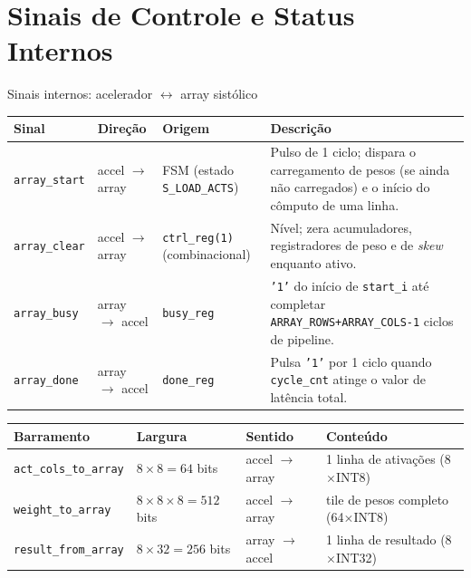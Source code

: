 \documentclass[aspectratio=169,10pt]{beamer}
\begin{document}
\section{Sinais de Controle e Status Internos}

\begin{frame}{Sinais internos: acelerador $\leftrightarrow$ array sistólico}
  \small
  \begin{tabularx}{\linewidth}{lll X}
    \toprule
    \textbf{Sinal} & \textbf{Direção} & \textbf{Origem} & \textbf{Descrição} \\
    \midrule
    \texttt{array\_start} & accel $\to$ array & FSM (estado \texttt{S\_LOAD\_ACTS}) &
      Pulso de 1 ciclo; dispara o carregamento de pesos (se ainda não carregados)
      e o início do cômputo de uma linha. \\
    \texttt{array\_clear} & accel $\to$ array & \texttt{ctrl\_reg(1)} (combinacional) &
      Nível; zera acumuladores, registradores de peso e de \emph{skew} enquanto ativo. \\
    \texttt{array\_busy} & array $\to$ accel & \texttt{busy\_reg} &
      \texttt{'1'} do início de \texttt{start\_i} até completar \texttt{ARRAY\_ROWS+ARRAY\_COLS-1}
      ciclos de pipeline. \\
    \texttt{array\_done} & array $\to$ accel & \texttt{done\_reg} &
      Pulsa \texttt{'1'} por 1 ciclo quando \texttt{cycle\_cnt} atinge o valor de latência total. \\
    \bottomrule
  \end{tabularx}

  \vspace{1em}
  \begin{tabularx}{\linewidth}{lll X}
    \toprule
    \textbf{Barramento} & \textbf{Largura} & \textbf{Sentido} & \textbf{Conteúdo} \\
    \midrule
    \texttt{act\_cols\_to\_array} & $8\times8=64$ bits & accel $\to$ array & 1 linha de ativações (8$\times$INT8) \\
    \texttt{weight\_to\_array}   & $8\times8\times8=512$ bits & accel $\to$ array & tile de pesos completo (64$\times$INT8) \\
    \texttt{result\_from\_array} & $8\times32=256$ bits & array $\to$ accel & 1 linha de resultado (8$\times$INT32) \\
    \bottomrule
  \end{tabularx}
\end{frame}
\end{document}
